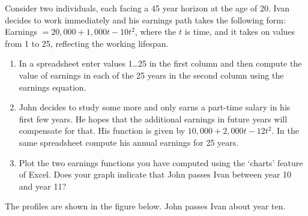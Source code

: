 \begin{enumialphparenastyle}
\begin{econex}\label{ex:ch13ex4}
Consider two individuals, each facing a 45 year horizon at the age of 20. Ivan decides to work immediately and his earnings path takes the following form: Earnings $=20,000+1,000t-10t^2$, where the $t$ is time, and it takes on values from 1 to 25, reflecting the working lifespan.
\begin{enumerate}
\item	In a spreadsheet enter values 1\dots 25 in the first column and then compute the value of earnings in each of the 25 years in the second column using the earnings equation.
\item	John decides to study some more and only earns a part-time salary in his first few years. He hopes that the additional earnings in future years will compensate for that. His function is given by $10,000+2,000t-12t^2$. In the same spreadsheet compute his annual earnings for 25 years.
\item	Plot the two earnings functions you have computed using the `charts' feature of Excel. Does your graph indicate that John passes Ivan between year 10 and year 11?
\end{enumerate}
\begin{econsolution}
The profiles are shown in the figure below. John passes Ivan about year ten.
\begin{center*}
\end{center*}
\end{econsolution}
\end{econex}


\end{enumialphparenastyle}
